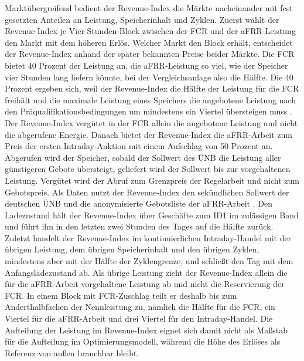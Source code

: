 Marktübergreifend bedient der Revenue-Index die Märkte nacheinander mit fest gesetzten Anteilen an Leistung, Speicherinhalt und Zyklen.
Zuerst wählt der Revenue-Index je Vier-Stunden-Block zwischen der \ac{FCR} und der \ac{aFRR}-Leistung den Markt mit dem höheren Erlös.
Welcher Markt den Block erhält, entscheidet der Revenue-Index anhand der später bekannten Preise beider Märkte.
Die \ac{FCR} bietet 40 Prozent der Leistung an, die \ac{aFRR}-Leistung so viel, wie der Speicher vier Stunden lang liefern könnte, bei der Vergleichsanlage also die Hälfte.
Die 40 Prozent ergeben sich, weil der Revenue-Index die Hälfte der Leistung für die \ac{FCR} freihält und die maximale Leistung eines Speichers die angebotene Leistung nach den Präqualifikationsbedingungen um mindestens ein Viertel übersteigen muss \cite{ubertragungsnetzbetreiber_deutschland_praqualifikationsverfahren_2024}.
Der Revenue-Index vergütet in der \ac{FCR} allein die angebotene Leistung und nicht die abgerufene Energie.
Danach bietet der Revenue-Index die \ac{aFRR}-Arbeit zum Preis der ersten Intraday-Auktion mit einem Aufschlag von 50 Prozent an.
Abgerufen wird der Speicher, sobald der Sollwert des \ac{ÜNB} die Leistung aller günstigeren Gebote übersteigt, geliefert wird der Sollwert bis zur vorgehaltenen Leistung.
Vergütet wird der Abruf zum Grenzpreis der Regelarbeit und nicht zum Gebotspreis.
Als Daten nutzt der Revenue-Index den sekündlichen Sollwert der deutschen \ac{ÜNB} \cite{netztransparenz_regelenergie_2026} und die anonymisierte Gebotsliste der \ac{aFRR}-Arbeit \cite{regelleistung_ausschreibungsdaten_2026}.
Den Ladezustand hält der Revenue-Index über Geschäfte zum \ac{ID1} im zulässigen Band und führt ihn in den letzten zwei Stunden des Tages auf die Hälfte zurück.
Zuletzt handelt der Revenue-Index im kontinuierlichen Intraday-Handel mit der übrigen Leistung, dem übrigen Speicherinhalt und den übrigen Zyklen, mindestens aber mit der Hälfte der Zyklengrenze, und schließt den Tag mit dem Anfangsladezustand ab.
Als übrige Leistung zieht der Revenue-Index allein die für die \ac{aFRR}-Arbeit vorgehaltene Leistung ab und nicht die Reservierung der \ac{FCR}.
In einem Block mit \ac{FCR}-Zuschlag teilt er deshalb bis zum Anderthalbfachen der Nennleistung zu, nämlich die Hälfte für die \ac{FCR}, ein Viertel für die \ac{aFRR}-Arbeit und drei Viertel für den Intraday-Handel.
Die Aufteilung der Leistung im Revenue-Index eignet sich damit nicht als Maßstab für die Aufteilung im Optimierungsmodell, während die Höhe des Erlöses als Referenz von außen brauchbar bleibt.

